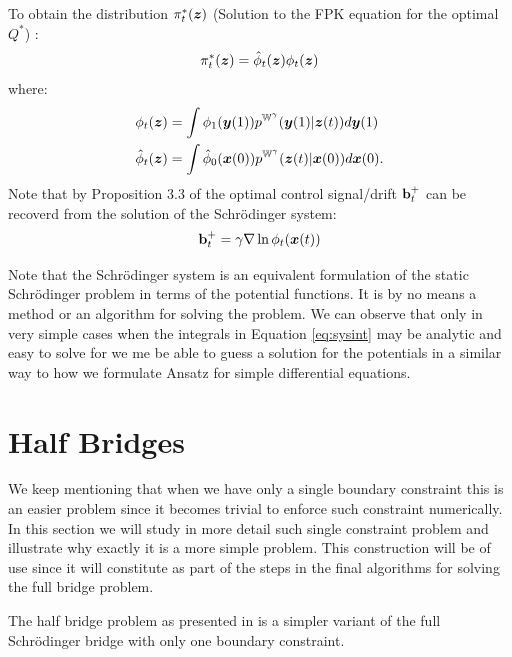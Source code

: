 \documentclass[a4paper,12pt,twoside,openright]{report}
\theoremstyle{definition}
\begin{document}
To obtain the distribution $\pi^{*}_t({\bm{z}})$ (Solution to the FPK equation for the optimal $Q^{*}$) :
\begin{align}
    \pi^{*}_t({\bm{z}}) =  {\hat{\phi}}_t({\bm{z}}) \phi_t({\bm{z}}) 
\end{align}
where:
\begin{align}
    \phi_t({\bm{z}}) &= \int \phi_1({\bm{y}}(1) ) p^{\mathbb{W}^{\gamma}}({\bm{y}}(1)|{\bm{z}}(t)) d{\bm{y}}(1) \nonumber\\ 
    {\hat{\phi}}_t({\bm{z}}) &= \int {\hat{\phi}}_0({\bm{x}}(0)) p^{\mathbb{W}^{\gamma}}({\bm{z}}(t)|{\bm{x}}(0)) d{\bm{x}}(0). \nonumber
\end{align}
Note that by Proposition 3.3 of \cite{pavon1991free} the optimal control signal/drift ${\mathbf{b}}_t^+$ can be recoverd from the solution of the Schrödinger system:
\begin{align} \label{eq:drifr_potential}
    {\mathbf{b}}_t^{+} = \gamma \nabla \ln \phi_t({\bm{x}}(t) )
\end{align}

Note that the Schrödinger system is an equivalent formulation of the static Schrödinger problem in terms of the potential functions. It is by no means a method or an algorithm for solving the problem. We can observe that only in very simple cases when the integrals in Equation \ref{eq:sysint} may be analytic and easy to solve for we me be able to guess a solution for the potentials in a similar way to how we formulate Ansatz for simple differential equations. 

\section{Half Bridges}

We keep mentioning that when we have only a single boundary constraint this is an easier problem since it becomes trivial to enforce such constraint numerically. In this section we will study in more detail such single constraint problem  and illustrate why exactly it is a more simple problem. This construction will be of use since it will constitute as part of the steps in the final algorithms for solving the full bridge problem.

The half bridge problem as presented in \cite{pavon2018data} is a simpler variant of the full Schrödinger bridge with only one boundary constraint. 
\end{document}
